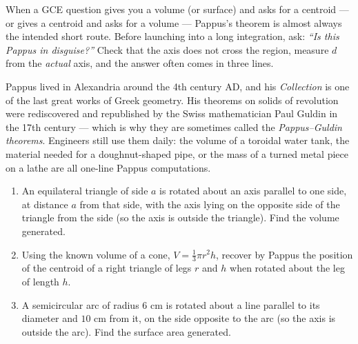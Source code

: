 \documentclass[11pt]{article}
\begin{document}
\begin{aretenir}
When a GCE question gives you a volume (or surface) and asks for a centroid — or gives a centroid and asks for a volume — Pappus's theorem is almost always the intended short route. Before launching into a long integration, ask: \emph{``Is this Pappus in disguise?''} Check that the axis does not cross the region, measure $d$ from the \emph{actual} axis, and the answer often comes in three lines.
\end{aretenir}

\begin{savaistu}
Pappus lived in Alexandria around the 4th century AD, and his \emph{Collection} is one of the last great works of Greek geometry. His theorems on solids of revolution were rediscovered and republished by the Swiss mathematician Paul Guldin in the 17th century — which is why they are sometimes called the \emph{Pappus--Guldin theorems}. Engineers still use them daily: the volume of a toroidal water tank, the material needed for a doughnut-shaped pipe, or the mass of a turned metal piece on a lathe are all one-line Pappus computations.
\end{savaistu}

\begin{exercice}
\begin{enumerate}
\item An equilateral triangle of side $a$ is rotated about an axis parallel to one side, at distance $a$ from that side, with the axis lying on the opposite side of the triangle from the side (so the axis is outside the triangle). Find the volume generated.
\item Using the known volume of a cone, $V = \tfrac{1}{3}\pi r^2 h$, recover by Pappus the position of the centroid of a right triangle of legs $r$ and $h$ when rotated about the leg of length $h$.
\item A semicircular arc of radius $6$ cm is rotated about a line parallel to its diameter and $10$ cm from it, on the side opposite to the arc (so the axis is outside the arc). Find the surface area generated.
\end{enumerate}
\end{exercice}
\end{document}
